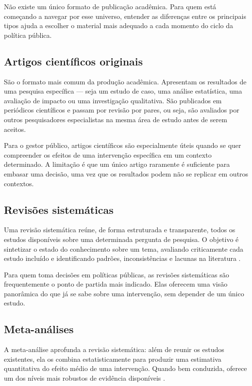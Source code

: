 \documentclass[12pt, a4paper, openany]{book}
\begin{document}
Não existe um único formato de publicação acadêmica. Para quem está começando a
navegar por esse universo, entender as diferenças entre os principais tipos
ajuda a escolher o material mais adequado a cada momento do ciclo da política
pública.

\subsection{Artigos científicos originais}

São o formato mais comum da produção acadêmica. Apresentam os resultados de uma
pesquisa específica --- seja um estudo de caso, uma análise estatística, uma
avaliação de impacto ou uma investigação qualitativa. São publicados em
periódicos científicos e passam por revisão por pares, ou seja, são avaliados
por outros pesquisadores especialistas na mesma área de estudo antes de serem
aceitos.

Para o gestor público, artigos científicos são especialmente úteis quando se
quer compreender os efeitos de uma intervenção específica em um contexto
determinado. A limitação é que um único artigo raramente é suficiente para
embasar uma decisão, uma vez que os resultados podem não se replicar em outros
contextos.

\subsection{Revisões sistemáticas}

Uma revisão sistemática reúne, de forma estruturada e transparente, todos os
estudos disponíveis sobre uma determinada pergunta de pesquisa. O objetivo é
sintetizar o estado do conhecimento sobre um tema, avaliando criticamente cada
estudo incluído e identificando padrões, inconsistências e lacunas na
literatura \citep{Higgins2019}.

Para quem toma decisões em políticas públicas, as revisões sistemáticas são
frequentemente o ponto de partida mais indicado. Elas oferecem uma visão
panorâmica do que já se sabe sobre uma intervenção, sem depender de um único
estudo.

\subsection{Meta-análises}

A meta-análise aprofunda a revisão sistemática: além de reunir os estudos
existentes, ela os combina estatisticamente para produzir uma estimativa
quantitativa do efeito médio de uma intervenção. Quando bem conduzida, oferece
um dos níveis mais robustos de evidência disponíveis \citep{Borenstein2009}.
\end{document}
